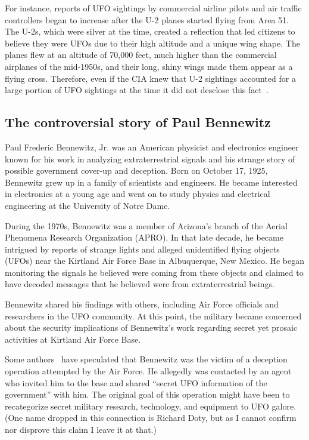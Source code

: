 For instance, reports of UFO sightings by commercial airline pilots and air traffic controllers began to increase after the
U-2 planes started flying from Area 51.
The U-2s, which were silver at the time, created a reflection that led citizens to believe they were UFOs due to their high altitude
and a unique wing shape. The planes flew at an altitude of 70,000 feet, much higher than the commercial airplanes of the mid-1950s,
and their long, shiny wings made them appear as a flying cross. Therefore, even if the CIA knew that U-2 sightings accounted for
a large portion of UFO sightings at the time it did not desclose this fact~\cite[Chapter~4]{Jacobsen2011}.

\subsection{The controversial story of Paul Bennewitz}

Paul Frederic Bennewitz, Jr. was an American physicist and electronics engineer
known for his work in analyzing extraterrestrial signals and his strange story of possible government cover-up and deception.
Born on October 17, 1925, Bennewitz grew up in a family of scientists and engineers. He became interested in electronics at a young age and went on to study physics and electrical engineering at the University of Notre Dame.

During the 1970s, Bennewitz was a member of Arizona's branch of the Aerial Phenomena Research Organization (APRO).
In that late decade, he became
intrigued by reports of strange lights and alleged unidentified flying objects (UFOs) near the Kirtland Air Force Base in Albuquerque, New Mexico. He began monitoring the signals he believed were coming from these objects and claimed to have decoded messages that he believed were from extraterrestrial beings.

Bennewitz shared his findings with others, including Air Force officials and researchers in the UFO community. At this point, the military became concerned about the security implications of Bennewitz's work regarding secret yet prosaic activities at Kirtland Air Force Base.

Some authors~\cite{Pilkington2010Sep,Pilkington2013} have speculated that Bennewitz was the victim of a deception operation attempted by the Air Force.
He allegedly was contacted by an agent who invited him to the base and shared ``secret UFO information of the government'' with him. The original goal of this operation might have been to recategorize secret military research, technology, and equipment to UFO galore.
(One name dropped in this connection is Richard Doty, but as I cannot confirm nor disprove this claim I leave it at that.)

